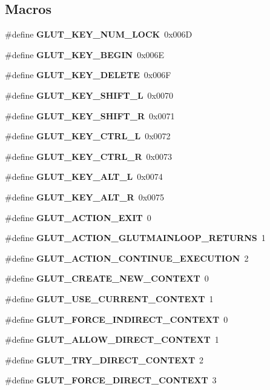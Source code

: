 \subsection*{Macros}
\begin{DoxyCompactItemize}
\item 
\#define {\bf G\+L\+U\+T\+\_\+\+K\+E\+Y\+\_\+\+N\+U\+M\+\_\+\+L\+O\+C\+K}~0x006\+D
\item 
\#define {\bf G\+L\+U\+T\+\_\+\+K\+E\+Y\+\_\+\+B\+E\+G\+I\+N}~0x006\+E
\item 
\#define {\bf G\+L\+U\+T\+\_\+\+K\+E\+Y\+\_\+\+D\+E\+L\+E\+T\+E}~0x006\+F
\item 
\#define {\bf G\+L\+U\+T\+\_\+\+K\+E\+Y\+\_\+\+S\+H\+I\+F\+T\+\_\+\+L}~0x0070
\item 
\#define {\bf G\+L\+U\+T\+\_\+\+K\+E\+Y\+\_\+\+S\+H\+I\+F\+T\+\_\+\+R}~0x0071
\item 
\#define {\bf G\+L\+U\+T\+\_\+\+K\+E\+Y\+\_\+\+C\+T\+R\+L\+\_\+\+L}~0x0072
\item 
\#define {\bf G\+L\+U\+T\+\_\+\+K\+E\+Y\+\_\+\+C\+T\+R\+L\+\_\+\+R}~0x0073
\item 
\#define {\bf G\+L\+U\+T\+\_\+\+K\+E\+Y\+\_\+\+A\+L\+T\+\_\+\+L}~0x0074
\item 
\#define {\bf G\+L\+U\+T\+\_\+\+K\+E\+Y\+\_\+\+A\+L\+T\+\_\+\+R}~0x0075
\item 
\#define {\bf G\+L\+U\+T\+\_\+\+A\+C\+T\+I\+O\+N\+\_\+\+E\+X\+I\+T}~0
\item 
\#define {\bf G\+L\+U\+T\+\_\+\+A\+C\+T\+I\+O\+N\+\_\+\+G\+L\+U\+T\+M\+A\+I\+N\+L\+O\+O\+P\+\_\+\+R\+E\+T\+U\+R\+N\+S}~1
\item 
\#define {\bf G\+L\+U\+T\+\_\+\+A\+C\+T\+I\+O\+N\+\_\+\+C\+O\+N\+T\+I\+N\+U\+E\+\_\+\+E\+X\+E\+C\+U\+T\+I\+O\+N}~2
\item 
\#define {\bf G\+L\+U\+T\+\_\+\+C\+R\+E\+A\+T\+E\+\_\+\+N\+E\+W\+\_\+\+C\+O\+N\+T\+E\+X\+T}~0
\item 
\#define {\bf G\+L\+U\+T\+\_\+\+U\+S\+E\+\_\+\+C\+U\+R\+R\+E\+N\+T\+\_\+\+C\+O\+N\+T\+E\+X\+T}~1
\item 
\#define {\bf G\+L\+U\+T\+\_\+\+F\+O\+R\+C\+E\+\_\+\+I\+N\+D\+I\+R\+E\+C\+T\+\_\+\+C\+O\+N\+T\+E\+X\+T}~0
\item 
\#define {\bf G\+L\+U\+T\+\_\+\+A\+L\+L\+O\+W\+\_\+\+D\+I\+R\+E\+C\+T\+\_\+\+C\+O\+N\+T\+E\+X\+T}~1
\item 
\#define {\bf G\+L\+U\+T\+\_\+\+T\+R\+Y\+\_\+\+D\+I\+R\+E\+C\+T\+\_\+\+C\+O\+N\+T\+E\+X\+T}~2
\item 
\#define {\bf G\+L\+U\+T\+\_\+\+F\+O\+R\+C\+E\+\_\+\+D\+I\+R\+E\+C\+T\+\_\+\+C\+O\+N\+T\+E\+X\+T}~3

\end{DoxyCompactItemize}
